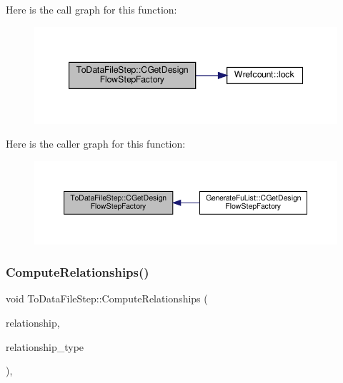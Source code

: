 Here is the call graph for this function\+:
\nopagebreak
\begin{figure}[H]
\begin{center}
\leavevmode
\includegraphics[width=347pt]{d6/d54/classToDataFileStep_a2c4090d1f2b890df6a10cc716221c9e9_cgraph}
\end{center}
\end{figure}
Here is the caller graph for this function\+:
\nopagebreak
\begin{figure}[H]
\begin{center}
\leavevmode
\includegraphics[width=350pt]{d6/d54/classToDataFileStep_a2c4090d1f2b890df6a10cc716221c9e9_icgraph}
\end{center}
\end{figure}
\mbox{\label{classToDataFileStep_aa2644f2c16d52ff381a6c52eef19c7c5}} 
\subsubsection{\texorpdfstring{Compute\+Relationships()}{ComputeRelationships()}}
{\footnotesize\ttfamily void To\+Data\+File\+Step\+::\+Compute\+Relationships (\begin{DoxyParamCaption}\item[{\hyperlink{classDesignFlowStepSet}{Design\+Flow\+Step\+Set} \&}]{relationship,  }\item[{const \hyperlink{classDesignFlowStep_a723a3baf19ff2ceb77bc13e099d0b1b7}{Design\+Flow\+Step\+::\+Relationship\+Type}}]{relationship\+\_\+type }\end{DoxyParamCaption})\hspace{0.3cm}{\ttfamily [override]}, {}}



